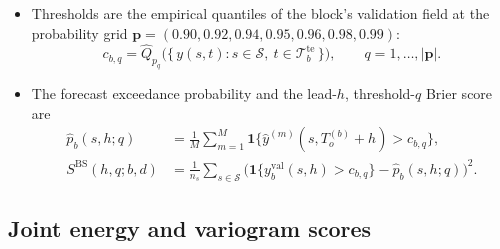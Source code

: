 \documentclass[11pt]{article}
\newcommand{\indicator}{\mathbf{1}}
\begin{document}
\begin{itemize}[leftmargin=1.4em]
  \item Thresholds are the empirical quantiles of the block's
        validation field at the probability grid
        $\bm p = (0.90,0.92,0.94,0.95,0.96,0.98,0.99)$:
        \begin{equation}
          c_{b,q}
          = \hat Q_{p_q}\!\big(\{\,y(s,t):
              s\in\mathcal S,\ t\in\mathcal T_b^{\mathrm{te}}\,\}\big),
          \qquad q = 1,\dots,|\bm p| .
          \label{eq:thresholds}
        \end{equation}
  \item The forecast exceedance probability and the lead-$h$,
        threshold-$q$ Brier score are
        \begin{align}
          \hat p_b(s,h;q)
            &= \frac1M\sum_{m=1}^M
               \indicator\big\{\hat y^{(m)}(s,T_o^{(b)}+h) > c_{b,q}\big\},
          \label{eq:phat}\\
          S^{\mathrm{BS}}(h,q;b,d)
            &= \frac1{n_s}\sum_{s\in\mathcal S}
               \Big(\indicator\big\{y^{\mathrm{val}}_b(s,h)>c_{b,q}\big\}
                    - \hat p_b(s,h;q)\Big)^2 .
          \label{eq:brier}
        \end{align}
\end{itemize}

\subsection{Joint energy and variogram scores}
\end{document}
